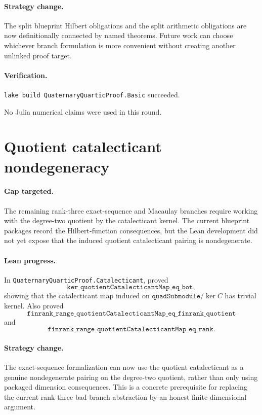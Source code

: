 \documentclass[11pt]{article}
\begin{document}
\paragraph{Strategy change.}
The split blueprint Hilbert obligations and the split arithmetic obligations
are now definitionally connected by named theorems.  Future work can choose
whichever branch formulation is more convenient without creating another
unlinked proof target.

\paragraph{Verification.}
\texttt{lake build QuaternaryQuarticProof.Basic} succeeded.

No Julia numerical claims were used in this round.

\section*{Quotient catalecticant nondegeneracy}

\paragraph{Gap targeted.}
The remaining rank-three exact-sequence and Macaulay branches require working
with the degree-two quotient by the catalecticant kernel.  The current
blueprint packages record the Hilbert-function consequences, but the Lean
development did not yet expose that the induced quotient catalecticant pairing
is nondegenerate.

\paragraph{Lean progress.}
In \texttt{QuaternaryQuarticProof.Catalecticant}, proved
\[
\texttt{ker\_quotientCatalecticantMap\_eq\_bot},
\]
showing that the catalecticant map induced on
\(\texttt{quadSubmodule} / \ker C\) has trivial kernel.  Also proved
\[
\texttt{finrank\_range\_quotientCatalecticantMap\_eq\_finrank\_quotient}
\]
and
\[
\texttt{finrank\_range\_quotientCatalecticantMap\_eq\_rank}.
\]

\paragraph{Strategy change.}
The exact-sequence formalization can now use the quotient catalecticant as a
genuine nondegenerate pairing on the degree-two quotient, rather than only
using packaged dimension consequences.  This is a concrete prerequisite for
replacing the current rank-three bad-branch abstraction by an honest
finite-dimensional argument.
\end{document}
